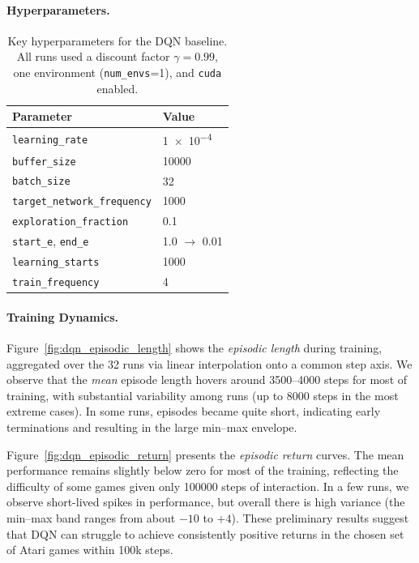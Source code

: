 \paragraph{Hyperparameters.}
\begin{table}[htb]
	\centering
	\begin{tabular}{l l}
		\toprule
		\textbf{Parameter} & \textbf{Value} \\
		\midrule
		\texttt{learning\_rate} & \num{1e-4} \\
		\texttt{buffer\_size} & \num{10000} \\
		\texttt{batch\_size} & \num{32} \\
		\texttt{target\_network\_frequency} & \num{1000} \\
		\texttt{exploration\_fraction} & \num{0.1} \\
		\texttt{start\_e}, \texttt{end\_e} & \num{1.0} $\to$ \num{0.01} \\
		\texttt{learning\_starts} & \num{1000} \\
		\texttt{train\_frequency} & \num{4} \\
		\bottomrule
	\end{tabular}
	\caption{Key hyperparameters for the DQN baseline. 
		All runs used a discount factor $\gamma = 0.99$,
		one environment (\texttt{num\_envs}=1), 
		and \texttt{cuda} enabled.}
	\label{tab:dqn-hyperparams}
\end{table}

\paragraph{Training Dynamics.}
Figure~\ref{fig:dqn_episodic_length} shows the \emph{episodic length} during training, aggregated over the 32 runs via linear interpolation onto a common step axis. We observe that the \emph{mean} episode length hovers around 3500--4000 steps for most of training, with substantial variability among runs (up to 8000 steps in the most extreme cases). In some runs, episodes became quite short, indicating early terminations and resulting in the large min--max envelope.

Figure~\ref{fig:dqn_episodic_return} presents the \emph{episodic return} curves. The mean performance remains slightly below zero for most of the training, reflecting the difficulty of some games given only \num{100000} steps of interaction. In a few runs, we observe short-lived spikes in performance, but overall there is high variance (the min--max band ranges from about $-10$ to $+4$). These preliminary results suggest that DQN can struggle to achieve consistently positive returns in the chosen set of Atari games within 100k steps.


